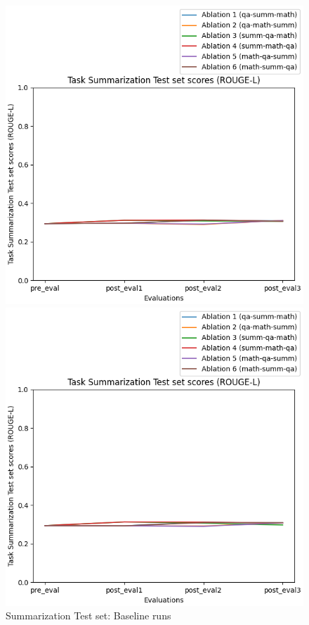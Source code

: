\begin{figure}[H]
    \centering
    \begin{minipage}{0.45\textwidth}
        \centering
        \includegraphics[width=1.1\textwidth]{Figures/results/trace_baseline_graphs/task_eval/summ_test_Test_baseline.png} %
        \captionsetup{width=1.1\textwidth}
        \caption{Summarization Test set: Baseline runs}
        \label{SummTestBaseline}
    \end{minipage}\hfill
    \begin{minipage}{0.45\textwidth}
        \centering
        \includegraphics[width=1.1\textwidth]{Figures/results/trace_mitigation_graphs/task_eval/summ_test_Test_mitigation.png} %

\end{minipage}
\end{figure}
